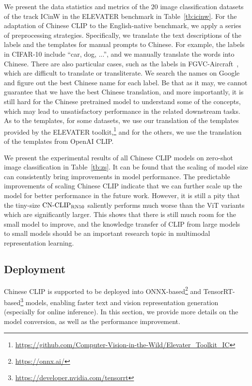 \documentclass[11pt]{article}
\begin{document}
%
 
We present the data statistics and metrics of the $20$ image classification datasets of the track ICinW in the ELEVATER benchmark in Table~\ref{tb:icinw}. 
For the adaptation of Chinese CLIP to the English-native benchmark, we apply a series of preprocessing strategies. Specifically, we translate the text descriptions of the labels and the templates for manual prompts to Chinese. 
For example, the labels in CIFAR-10 include ``car, dog, ...'', and we manually translate the words into Chinese. 
There are also particular cases, such as the labels in FGVC-Aircraft~\citep{fgvc}, which are difficult to translate or transliterate. 
We search the names on Google and figure out the best Chinese name for each label. 
Be that as it may, we cannot guarantee that we have the best Chinese translation, and more importantly, it is still hard for the Chinese pretrained model to understand some of the concepts, which may lead to unsatisfactory performance in the related downstream tasks. 
As to the templates, for some datasets, we use our translation of the templates provided by the ELEVATER toolkit,\footnote{\url{https://github.com/Computer-Vision-in-the-Wild/Elevater\_Toolkit\_IC}} and for the others, we use the translation of the templates from OpenAI CLIP.

We present the experimental results of all Chinese CLIP models on zero-shot image classification in Table~\ref{tb:zs}. 
It can be found that the scaling of model size can consistently bring improvements in model performance. 
The predictable improvements of scaling Chinese CLIP indicate that we can further scale up the model for better performance in the future work.  
However, it is still a pity that the tiny-size $\text{CN-CLIP}\rm_{RN50}$ saliently performs much worse than the ViT variants which are significantly larger. 
This shows that there is still much room for the small model to improve, and the knowledge transfer of CLIP from large models to small models should be an important research topic in multimodal representation learning. 

\subsection{Deployment}
\label{appendix:deployment}

Chinese CLIP is supported to be deployed into ONNX-based\footnote{\url{https://onnx.ai/}} and TensorRT-based\footnote{\url{https://developer.nvidia.com/tensorrt}} models, enabling faster text and vision representation generation (especially for online inference). In this section, we provide more details on the model conversion, as well as the performance improvement. 
\end{document}

